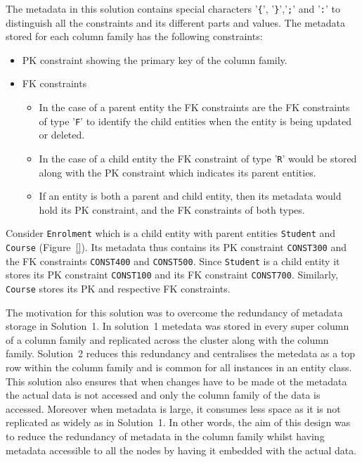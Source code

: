 The metadata in this solution contains special characters '\texttt{\{}',
'\texttt{\}}','\texttt{;}' and '\texttt{:}' to distinguish all the constraints
and its different parts and values.
The metadata stored for each column family has the following constraints:
	\begin{itemize}
	  \item  \ac{PK} constraint showing the primary key of the column family.
	  \item \ac{FK} constraints 
			\begin{itemize}
				\item In the case of a parent entity the \ac{FK} constraints are the \ac{FK}
				constraints of type '\texttt{F}' to identify the child entities when the entity
				is being updated or deleted.
				\item  In the case of a child entity the \ac{FK} constraint of type '\texttt{R}'
				would be stored along with the \ac{PK} constraint which indicates its parent
				entities.
				\item If an entity is both a parent and child entity, then its metadata would
				hold its \ac{PK} constraint, and the \ac{FK} constraints of both types.
			\end{itemize}
	\end{itemize}
	
Consider \texttt{Enrolment}  which is a child entity with parent entities
\texttt{Student} and \texttt{Course} (Figure~\ref{}). Its metadata thus contains
its \ac{PK} constraint \texttt{CONST300} and the \ac{FK} constraints
\texttt{CONST400} and \texttt{CONST500}. Since \texttt{Student} is a child
entity it  stores its \ac{PK} constraint \texttt{CONST100} and its \ac{FK}
constraint \texttt{CONST700}. Similarly, \texttt{Course} stores its \ac{PK} and
respective \ac{FK} constraints.

	\begin{figure}
	\end{figure}
	
The motivation for this solution was to overcome the redundancy of metadata
storage in Solution~1. In solution~1 metedata was stored in every super column
of a column family and replicated across the cluster along with the column
family. Solution~2 reduces this redundancy and centralises the metedata as a top
row within the column family and is common for all instances in an entity class.
This solution also ensures that when changes have to be made ot the metadata the
actual data is not accessed and only the column family of the data is accessed. 
Moreover when metadata is large, it consumes less space as it is not replicated
as widely as in Solution~1.
In other words, the aim of this design was to reduce the redundancy of metadata
in the column family whilst having metadata accessible to all the nodes by
having it embedded with the actual data.


